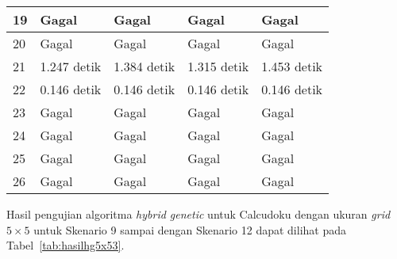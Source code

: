 \begin{table}
\begin{tabular}{| l | l | l | l | l |}
\hline
19 & Gagal & Gagal & Gagal & Gagal \\
\hline
20 & Gagal & Gagal & Gagal & Gagal \\
\hline
21 & 1.247 detik & 1.384 detik & 1.315 detik & 1.453 detik \\
\hline
22 & 0.146 detik & 0.146 detik & 0.146 detik & 0.146 detik \\
\hline
23 & Gagal & Gagal & Gagal & Gagal \\
\hline
24 & Gagal & Gagal & Gagal & Gagal \\
\hline
25 & Gagal & Gagal & Gagal & Gagal \\
\hline
26 & Gagal & Gagal & Gagal & Gagal \\
\hline
\end{tabular}
\label{tab:hasilhg5x52}
\end{table}

Hasil pengujian algoritma \textit{hybrid genetic} untuk Calcudoku dengan ukuran \textit{grid} \begin{math}5 \times 5\end{math} untuk Skenario 9 sampai dengan Skenario 12 dapat dilihat pada Tabel~\ref{tab:hasilhg5x53}.

